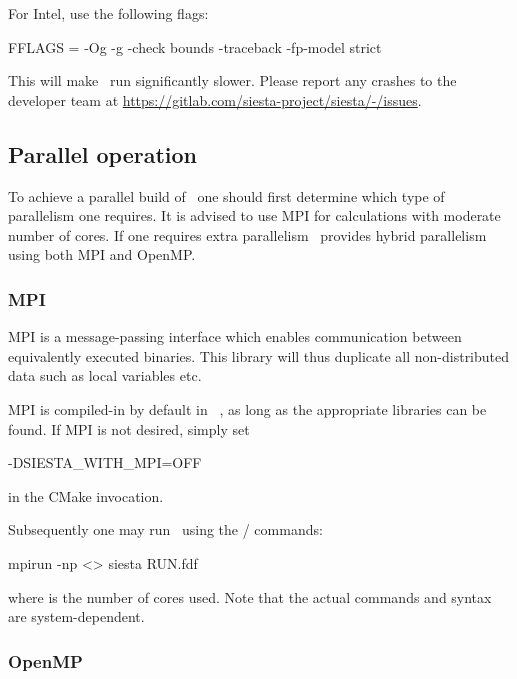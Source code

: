 For Intel, use the following flags:
\begin{shellexample}
  FFLAGS = -Og -g -check bounds -traceback -fp-model strict
\end{shellexample}

This will make \siesta\ run significantly slower. Please report any
crashes to the developer team at
\url{https://gitlab.com/siesta-project/siesta/-/issues}.


\subsection{Parallel operation}
\label{sec:parallel}

To achieve a parallel build of \siesta\ one should first determine
which type of parallelism one requires. It is advised to use MPI for
calculations with moderate number of cores. If one requires extra
parallelism \siesta\ provides hybrid parallelism using both MPI and
OpenMP.


\subsubsection{MPI}

MPI is a message-passing interface which enables communication between
equivalently executed binaries. This library will thus duplicate all
non-distributed data such as local variables etc.

MPI is compiled-in by default in \siesta\ , as long as the appropriate libraries
can be found. If MPI is not desired, simply set

\begin{shellexample}
  -DSIESTA_WITH_MPI=OFF
\end{shellexample}

in the CMake invocation.

Subsequently one may run \siesta\ using the
/ commands:
\begin{shellexample}
  mpirun -np <> siesta RUN.fdf
\end{shellexample}
where \shell{<>} is the number of cores used. Note that the actual commands and syntax are system-dependent.


\subsubsection{OpenMP}


